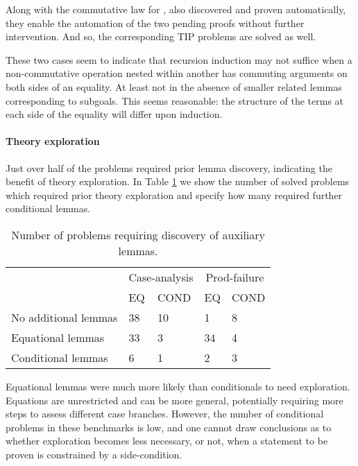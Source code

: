 \noindent Along with the commutative law for , also discovered and proven automatically, they enable the automation of the two pending proofs without further intervention.
%
And so, the corresponding TIP problems are solved as well.

These two cases seem to indicate that recursion induction may not suffice when a non-commutative operation nested within another has commuting arguments on both sides of an equality.
%
At least not in the absence of smaller related lemmas corresponding to subgoals.
%
This seems reasonable: the structure of the terms at each side of the equality will differ upon induction.

%


\paragraph{Theory exploration}

Just over half of the problems required prior lemma discovery, indicating the benefit of theory exploration. In Table \ref{tab:explore} we show the number of solved problems which required prior theory exploration and specify how many required further conditional lemmas.

\begin{table}
\begin{tabularx}{\textwidth}{l | X X | X X}
  & \multicolumn{2}{c|}{Case-analysis} & \multicolumn{2}{c}{Prod-failure} \\
  &  EQ & COND & EQ & COND \\
  \hline
  No additional lemmas & 38 & 10 & 1 & 8 \\
  Equational lemmas & 33 & 3 & 34 & 4 \\
  Conditional lemmas & 6 & 1 & 2 & 3 \\
\end{tabularx}
\caption{Number of problems requiring discovery of auxiliary lemmas.}
\label{tab:explore}
\end{table}

Equational lemmas were much more likely than conditionals to need exploration.
%
Equations are unrestricted and can be more general, potentially requiring more steps to assess different case branches.
%
However, the number of conditional problems in these benchmarks is low, and one cannot draw conclusions as to whether exploration becomes less necessary, or not, when a statement to be proven is constrained by a side-condition.%

